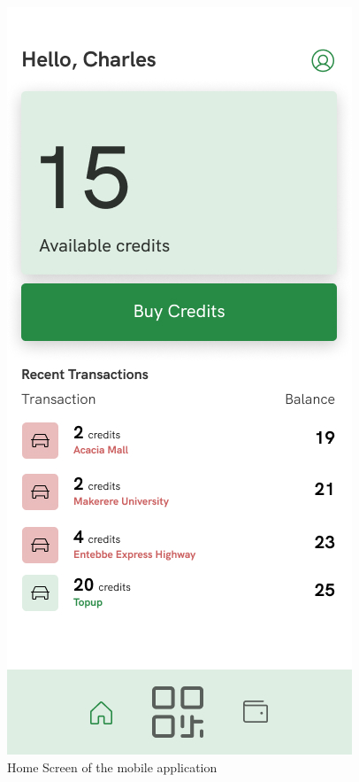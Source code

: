 \clearpage
\begin{figure}[h]
    \begin{center}
        \includegraphics[scale = 0.6]{images/Home}
        \caption{Home Screen of the mobile application}
    \end{center}
\end{figure}

